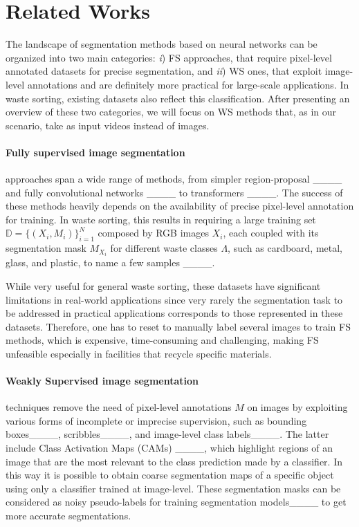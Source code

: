\section{Related Works}
\label{sec:related} 

The landscape  of segmentation methods based on neural networks can be organized into two main categories: \emph{i})  FS approaches, that require pixel-level annotated datasets for precise segmentation, and \emph{ii}) WS ones, that exploit image-level annotations and are definitely more practical for large-scale applications.
In waste sorting, existing datasets also reflect this %
classification. After presenting an overview of these two categories, we will focus on WS methods that, as in our scenario, take as input videos instead of images.

\paragraph{Fully supervised image segmentation} approaches span a wide range of methods, from simpler region-proposal ____ and fully convolutional networks ____ to transformers ____. The success of these methods heavily depends on the availability of precise pixel-level annotation for training. In waste sorting, this results in requiring a large training set \( \mathbb{D} = \{(X_i, M_i)\}_{i=1}^N \) composed by RGB images $X_i$, each coupled with its segmentation mask $M_{X_i}$ for different waste classes $\Lambda$, such as cardboard, metal, glass, and plastic, to name a few samples ____. 

While very useful for general waste sorting, these datasets have significant limitations in real-world applications since very rarely the segmentation task to be addressed in practical applications corresponds to those represented in these datasets. Therefore, one has to reset to manually label several images to train FS methods, which is expensive, time-consuming and challenging, making FS unfeasible especially in facilities that recycle specific materials.


\paragraph{Weakly Supervised image segmentation} techniques remove the need of pixel-level annotations $M$ on images by exploiting various forms of incomplete or imprecise supervision, such as bounding boxes____, scribbles____, and image-level class labels____. 
The latter include Class Activation Maps (CAMs) ____, which highlight regions of an image that are the most relevant to the class prediction made by a classifier. In this way it is possible to obtain coarse segmentation maps of a specific object using only a classifier trained at image-level. These segmentation masks can be considered as noisy pseudo-labels for training segmentation models____ to get more accurate segmentations.

